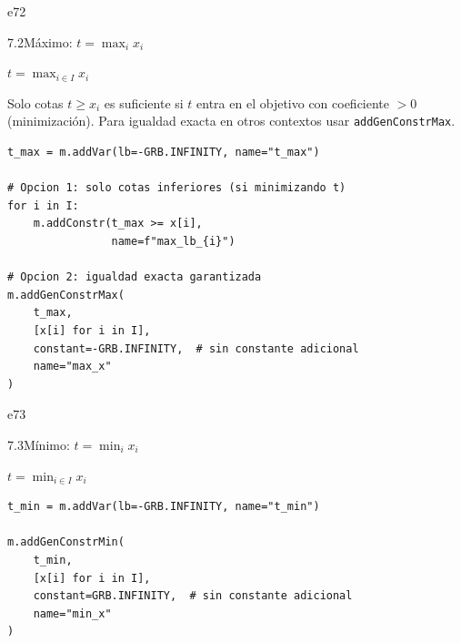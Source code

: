 \documentclass[10pt,a4paper]{article}
\newlength{\mathcolw}
\newlength{\codecolw}
\newcommand{\entryheader}[2][]{%
  \needspace{5cm}%
  \vspace{6pt}%
  \ifx\relax#1\relax\else\phantomsection\hypertarget{#1}{}\fi%
  \noindent%
  \begin{tcolorbox}[
    colback=subsecbg!18,
    colframe=subsecbg!45,
    sharp corners, boxrule=0.4pt,
    left=5pt, right=5pt, top=2pt, bottom=2pt,
    fontupper=\small\bfseries\sffamily,
  ]
  #2
  \end{tcolorbox}%
  \vspace{2pt}%
}
\newcommand{\py}[1]{\texttt{\small #1}}
\begin{document}
\vspace{4pt}

\entryheader[e72]{7.2\quad M\'aximo: $t = \max_i x_i$}
\noindent
\begin{minipage}[t]{\mathcolw}
    \begin{tcolorbox}[mathbox]
        $t = \displaystyle\max_{i \in I} x_i$
    \end{tcolorbox}
    \vspace{2pt}
    \begin{tcolorbox}[notebox]
        Solo cotas $t \geq x_i$ es suficiente si $t$ entra en el objetivo con coeficiente $> 0$ (minimizaci\'on). Para igualdad exacta en otros contextos usar \py{addGenConstrMax}.
    \end{tcolorbox}
\end{minipage}\hspace{0.02\textwidth}%
\begin{minipage}[t]{\codecolw}
    \begin{lstlisting}[style=gurobipy]
t_max = m.addVar(lb=-GRB.INFINITY, name="t_max")

# Opcion 1: solo cotas inferiores (si minimizando t)
for i in I:
    m.addConstr(t_max >= x[i],
                name=f"max_lb_{i}")

# Opcion 2: igualdad exacta garantizada
m.addGenConstrMax(
    t_max,
    [x[i] for i in I],
    constant=-GRB.INFINITY,  # sin constante adicional
    name="max_x"
)
\end{lstlisting}
\end{minipage}

\vspace{4pt}

\entryheader[e73]{7.3\quad M\'inimo: $t = \min_i x_i$}
\noindent
\begin{minipage}[t]{\mathcolw}
    \begin{tcolorbox}[mathbox]
        $t = \displaystyle\min_{i \in I} x_i$
    \end{tcolorbox}
\end{minipage}\hspace{0.02\textwidth}%
\begin{minipage}[t]{\codecolw}
    \begin{lstlisting}[style=gurobipy]
t_min = m.addVar(lb=-GRB.INFINITY, name="t_min")

m.addGenConstrMin(
    t_min,
    [x[i] for i in I],
    constant=GRB.INFINITY,  # sin constante adicional
    name="min_x"
)
\end{lstlisting}
\end{minipage}
\end{document}
